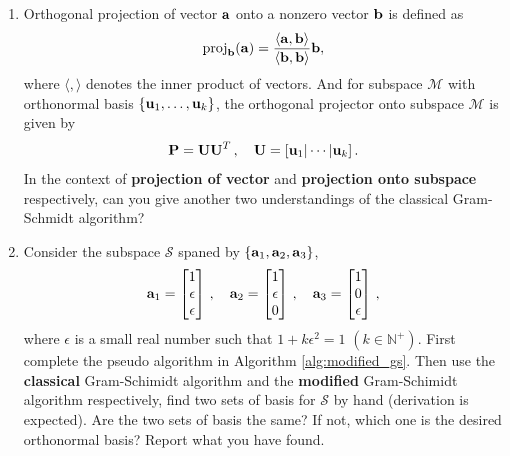 \documentclass[english,onecolumn]{IEEEtran}
\begin{document}
\begin{enumerate}
\begin{algorithm}[htbp]
\end{algorithm}
	\item 
	Orthogonal projection of vector ${\bf a}$ onto a nonzero vector ${\bf b}$ is defined as
	\[
	\text{proj}_\mathbf{b}(\bf a)=\frac{\langle{\bf a},{\bf b}\rangle}{\langle{\bf b},{\bf b}\rangle}{\bf b},
	\]
	where $\langle,\rangle$ denotes the inner product of vectors.
	And for subspace $\mathcal{M}$ with 
	orthonormal basis $\{ {\bf u}_1,\ldots, {\bf u}_k \}$, the orthogonal projector onto subspace $\mathcal{M}$ is given by 
	\[
	{\bf P} = {\bf UU}^T\,,\quad {\bf U} = [{\bf u}_1|\cdots|{\bf u}_k]\,.
	\]
	In the context of \textbf{projection of vector} and \textbf{projection onto subspace} respectively, can you give another two understandings of the classical Gram-Schmidt algorithm?
	\item Consider the subspace $\mathcal{S}$ spaned by $\{{\bf a}_1, {\bf a}_2, {\bf a}_3\}$,
	\[
	{\bf a}_1 = \begin{bmatrix} 1 \\ \epsilon \\ \epsilon \\ \end{bmatrix}\,,\quad 
	{\bf a}_2 =  \begin{bmatrix}1 \\ \epsilon \\ 0\end{bmatrix}\,,\quad 
	{\bf a}_3 =  \begin{bmatrix}1 \\ 0 \\ \epsilon\end{bmatrix}\,,
	\]
	where $\epsilon$ is a small real number such that $1+k\epsilon^2 =1$ $(k\in\mathbb{N}^+)$. 
	First complete the pseudo algorithm in Algorithm \ref{alg:modified_gs}.
	Then use the \textbf{classical} Gram-Schimidt algorithm and the \textbf{modified} Gram-Schimidt algorithm respectively, find two sets of basis for $\mathcal{S}$ by hand (derivation is expected). Are the two sets of basis the same? If not, which one is the desired orthonormal basis? Report what you have found.

\end{enumerate}
\end{document}
